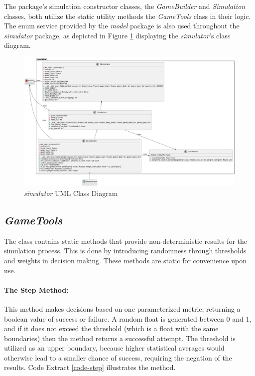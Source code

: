 \documentclass{thesis-ekf}
\theoremstyle{definition}
\theoremstyle{remark}
\begin{document}
The package's simulation constructor classes, the \emph{GameBuilder} and \emph{Simulation} classes, both utilize the static utility methods the \emph{GameTools} class in their logic. The enum service provided by the \emph{model} package is also used throughout the \emph{simulator} package, as depicted in Figure \ref{img-simulator-class} displaying the \emph{simulator}'s class diagram.

\begin{figure}[th!]
	\centering
	\includegraphics[width=1\linewidth]{img/class/simulator}
	\caption{\emph{simulator} UML Class Diagram}
	\label{img-simulator-class}
\end{figure}

\subsection{\emph{GameTools}}
The class contains static methods that provide non-deterministic results for the simulation process. This is done by introducing randomness through thresholds and weights in decision making. These methods are static for convenience upon use.

\paragraph{The Step Method:} This method makes decisions based on one parameterized metric, returning a boolean value of success or failure. A random float is generated between 0 and 1, and if it does not exceed the threshold (which is a float with the same boundaries) then the method returns a successful attempt. The threshold is utilized as an upper boundary, because higher statistical averages would otherwise lead to a smaller chance of success, requiring the negation of the results. Code Extract \ref{code-step} illustrates the method.

\end{document}
